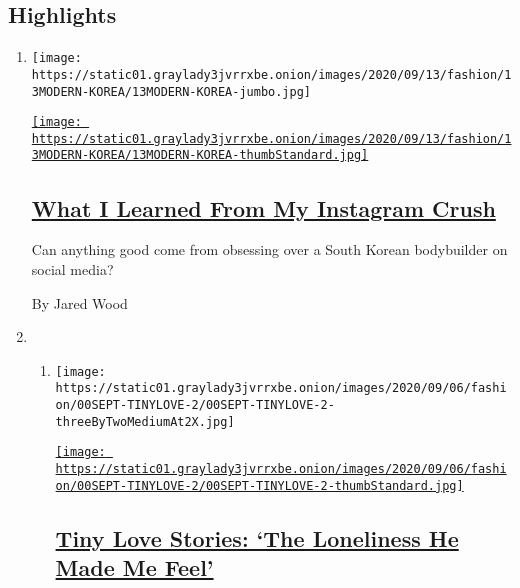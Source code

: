 \hypertarget{highlights}{%
\subsection{Highlights}\label{highlights}}

\begin{enumerate}
\def\labelenumi{\arabic{enumi}.}
\item
  \texttt{[image: https://static01.graylady3jvrrxbe.onion/images/2020/09/13/fashion/13MODERN-KOREA/13MODERN-KOREA-jumbo.jpg]}

  \href{/2020/09/11/style/modern-love-no-emoticon-for-this-emotion.html}{\texttt{[image: https://static01.graylady3jvrrxbe.onion/images/2020/09/13/fashion/13MODERN-KOREA/13MODERN-KOREA-thumbStandard.jpg]}}

  \hypertarget{what-i-learned-from-my-instagram-crush}{%
  \subsection{\texorpdfstring{\href{/2020/09/11/style/modern-love-no-emoticon-for-this-emotion.html}{What
  I Learned From My Instagram
  Crush}}{What I Learned From My Instagram Crush}}\label{what-i-learned-from-my-instagram-crush}}

  Can anything good come from obsessing over a South Korean bodybuilder
  on social media?

  By Jared Wood
\item
  \begin{enumerate}
  \def\labelenumii{\arabic{enumii}.}
  \item
    \texttt{[image: https://static01.graylady3jvrrxbe.onion/images/2020/09/06/fashion/00SEPT-TINYLOVE-2/00SEPT-TINYLOVE-2-threeByTwoMediumAt2X.jpg]}

    \href{/2020/09/08/style/tiny-modern-love-stories-the-loneliness-he-made-me-feel.html}{\texttt{[image: https://static01.graylady3jvrrxbe.onion/images/2020/09/06/fashion/00SEPT-TINYLOVE-2/00SEPT-TINYLOVE-2-thumbStandard.jpg]}}

    \hypertarget{tiny-love-stories-the-loneliness-he-made-me-feel}{%
    \subsection{\texorpdfstring{\href{/2020/09/08/style/tiny-modern-love-stories-the-loneliness-he-made-me-feel.html}{Tiny
    Love Stories: `The Loneliness He Made Me
    Feel'}}{Tiny Love Stories: `The Loneliness He Made Me Feel'}}\label{tiny-love-stories-the-loneliness-he-made-me-feel}}


\end{enumerate}
\end{enumerate}
